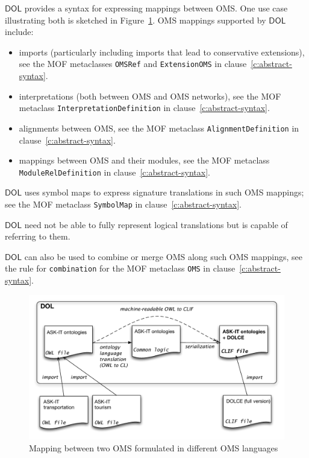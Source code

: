 \documentclass[10pt,fleqn,final]{scrreprt}
\newcommand*{\syntax}[1]{\texttt{#1}}
\newcommand*{\DOL}{\ensuremath{\mathsf{DOL}}\xspace}
\newcommand{\figurerefname}{Figure}
\newcommand{\fref}[1]{\figurerefname~\ref{#1}}
\newenvironment{definitions}[0]{\medskip }{}
\begin{document}
\begin{definitions}
\DOL provides a syntax for expressing mappings between OMS.  One use case illustrating both is sketched in  \fref{f:DOL-mapping}.  OMS mappings supported by \DOL include:
\begin{itemize}
\item imports (particularly including imports that lead to conservative extensions), see the
 MOF metaclasses   \syntax{OMSRef} and \syntax{ExtensionOMS} in
clause~\ref{c:abstract-syntax}.
\item interpretations (both between OMS and OMS networks), see the
 MOF metaclass   \syntax{InterpretationDefinition} in
clause~\ref{c:abstract-syntax}.
\item alignments between OMS, see the
 MOF metaclass   \syntax{AlignmentDefinition} in
clause~\ref{c:abstract-syntax}.
\item mappings between OMS and their modules, see the
 MOF metaclass   \syntax{ModuleRelDefinition} in
clause~\ref{c:abstract-syntax}.
\end{itemize}
\DOL uses symbol maps to express signature translations in such OMS mappings; see the
 MOF metaclass   \syntax{SymbolMap} in
clause~\ref{c:abstract-syntax}.

\DOL need not be able to fully represent logical translations but is
capable of referring to them.

\DOL can also be used to combine or merge OMS along such OMS mappings, see
the rule for \syntax{combination} for the  MOF metaclass  
\syntax{OMS} in clause~\ref{c:abstract-syntax}.

\begin{figure}
  \centering
  \includegraphics[width=\textwidth]{illustrations/DOLfig.pdf}
  \caption{Mapping between two OMS formulated in different OMS languages}
\label{f:DOL-mapping}
\end{figure}




\end{definitions}
\end{document}
